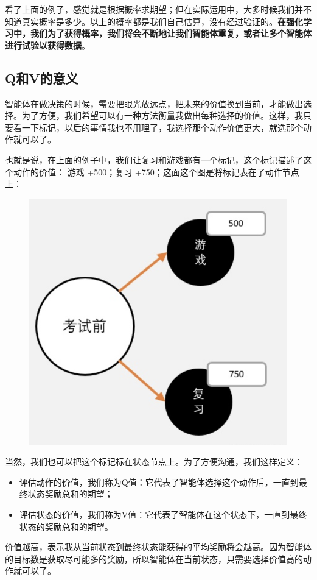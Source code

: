 \documentclass[12pt]{article}
\begin{document}
看了上面的例子，感觉就是根据概率求期望；但在实际运用中，大多时候我们并不知道真实概率是多少。以上的概率都是我们自己估算，没有经过验证的。\textbf{在强化学习中，我们为了获得概率，我们将会不断地让我们智能体重复，或者让多个智能体进行试验以获得数据}。

\subsection{Q和V的意义}
智能体在做决策的时候，需要把眼光放远点，把未来的价值换到当前，才能做出选择。为了方便，我们希望可以有一种方法衡量我做出每种选择的价值。这样，我只要看一下标记，以后的事情我也不用理了，我选择那个动作价值更大，就选那个动作就可以了。

也就是说，在上面的例子中，我们让复习和游戏都有一个标记，这个标记描述了这个动作的价值： 游戏 +500；复习 +750；这面这个图是将标记表在了动作节点上：
\begin{figure}[H]
    \centering
    \includegraphics[width=.3\textwidth]{fig/ReinforcementLearning/RL_V_Q_R_Example_3.png}
\end{figure}

当然，我们也可以把这个标记标在状态节点上。为了方便沟通，我们这样定义： 
\begin{itemize}
\setlength{\itemsep}{0pt}
\setlength{\parsep}{0pt}
\setlength{\parskip}{0pt}
    \item 评估动作的价值，我们称为Q值：它代表了智能体选择这个动作后，一直到最终状态奖励总和的期望；
    \item 评估状态的价值，我们称为V值：它代表了智能体在这个状态下，一直到最终状态的奖励总和的期望。
\end{itemize}

价值越高，表示我从当前状态到最终状态能获得的平均奖励将会越高。因为智能体的目标数是获取尽可能多的奖励，所以智能体在当前状态，只需要选择价值高的动作就可以了。
\end{document}
